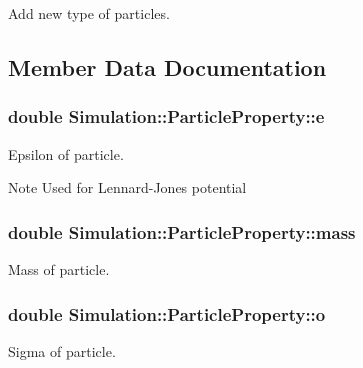 Add new type of particles. 



\subsection{Member Data Documentation}
\hypertarget{classSimulation_1_1ParticleProperty_a3b5090b0388ea6708f204377648b9f7d}{
\subsubsection[{e}]{\setlength{\rightskip}{0pt plus 5cm}double Simulation\-::\-Particle\-Property\-::e}}\label{classSimulation_1_1ParticleProperty_a3b5090b0388ea6708f204377648b9f7d}


Epsilon of particle. 

\begin{DoxyNote}{Note}
Used for Lennard-\/\-Jones potential 
\end{DoxyNote}
\hypertarget{classSimulation_1_1ParticleProperty_a8f145877445ca59f131da94402d2f754}{
\subsubsection[{mass}]{\setlength{\rightskip}{0pt plus 5cm}double Simulation\-::\-Particle\-Property\-::mass}}\label{classSimulation_1_1ParticleProperty_a8f145877445ca59f131da94402d2f754}


Mass of particle. 

\hypertarget{classSimulation_1_1ParticleProperty_a53851810b9a7de47591967ce60b69367}{
\subsubsection[{o}]{\setlength{\rightskip}{0pt plus 5cm}double Simulation\-::\-Particle\-Property\-::o}}\label{classSimulation_1_1ParticleProperty_a53851810b9a7de47591967ce60b69367}


Sigma of particle. 

